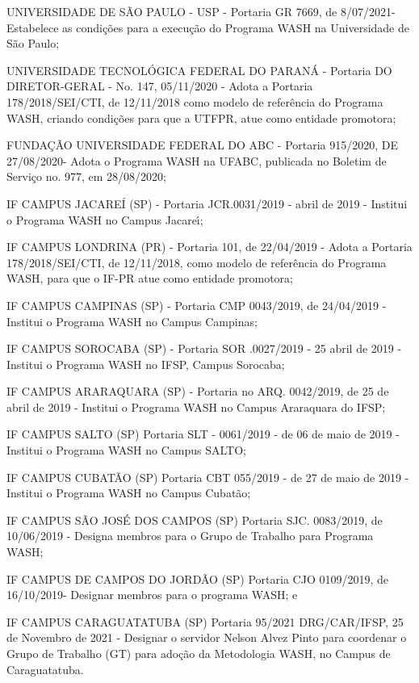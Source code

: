 \documentclass[
12pt,		%
openright,	%
twoside,  %
a4paper,			%
chapter=TITLE,		%
english,			%
french,				%
spanish,			%
brazil				%
]{USPSC-classe/USPSC}
\begin{document}
\begin{alineas}
\item UNIVERSIDADE DE S\~AO PAULO - USP - Portaria GR 7669, de 8/07/2021- Estabelece as condi\c{c}\~oes para a execu\c{c}\~ao do Programa WASH na Universidade de S\~ao Paulo;
\item UNIVERSIDADE TECNOL\'OGICA FEDERAL DO PARAN\'A - Portaria DO DIRETOR-GERAL - No. 147, 05/11/2020 - Adota a Portaria 178/2018/SEI/CTI, de 12/11/2018 como modelo de refer\^encia do Programa WASH, criando condi\c{c}\~oes para que a UTFPR, atue como entidade promotora;
\item FUNDA\c{C}\~AO UNIVERSIDADE FEDERAL DO ABC - Portaria 915/2020, DE 27/08/2020- Adota o Programa WASH na UFABC, publicada no Boletim de Servi\c{c}o no. 977, em 28/08/2020;
\item IF CAMPUS JACARE\'I (SP) - Portaria JCR.0031/2019 - abril de 2019 - Institui o Programa WASH no Campus Jacare\'{\i};
\item IF CAMPUS LONDRINA (PR) - Portaria 101, de 22/04/2019 - Adota a Portaria 178/2018/SEI/CTI, de 12/11/2018, como modelo de refer\^encia do Programa WASH, para que o IF-PR atue como entidade promotora;
\item IF CAMPUS CAMPINAS (SP) - Portaria CMP 0043/2019, de 24/04/2019 - Institui o Programa WASH no Campus Campinas;
\item IF CAMPUS SOROCABA  (SP) - Portaria SOR .0027/2019 - 25 abril de 2019 - Institui o Programa WASH no IFSP, Campus Sorocaba;
\item IF CAMPUS ARARAQUARA (SP) - Portaria no ARQ. 0042/2019, de 25 de abril de 2019 - Institui o Programa WASH no Campus Araraquara do IFSP;
\item IF CAMPUS SALTO (SP) Portaria SLT - 0061/2019 - de 06 de maio de 2019 - Institui o Programa WASH no Campus SALTO;
\item IF CAMPUS CUBAT\~AO (SP) Portaria CBT 055/2019 - de 27 de maio de 2019 - Institui o Programa WASH no Campus Cubat\~ao;
\item IF CAMPUS S\~AO JOS\'E DOS CAMPOS (SP) Portaria  SJC. 0083/2019, de 10/06/2019 - Designa membros para o Grupo de Trabalho para Programa WASH;
\item IF CAMPUS DE CAMPOS DO JORD\~AO (SP) Portaria CJO 0109/2019, de 16/10/2019- Designar membros para o programa WASH; e
\item IF CAMPUS CARAGUATATUBA (SP) Portaria 95/2021 DRG/CAR/IFSP, 25 de Novembro de 2021 - Designar o servidor Nelson Alvez Pinto para coordenar o Grupo de Trabalho (GT) para ado\c{c}\~ao da Metodologia WASH, no Campus de Caraguatatuba.
\end{alineas}
\end{document}
